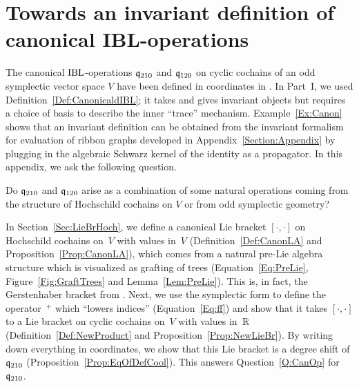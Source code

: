 \documentclass[\MainFolder/Text.tex]{subfiles}
\begin{document}
\chapter{Towards an invariant definition of canonical IBL-operations}
\label{Section:AppEqDefPrCoPr}
\allowdisplaybreaks
{}
The canonical $\mathrm{IBL}$-operations $\mathfrak{q}_{210}$ and $\mathfrak{q}_{120}$ on cyclic cochains of an odd symplectic vector space $V$ have been defined in coordinates in \cite{Cieliebak2015}. In Part~I, we used Definition~\ref{Def:CanonicaldIBL}; it takes and gives invariant objects but requires a choice of basis to describe the inner ``trace'' mechanism. Example~\ref{Ex:Canon} shows that an invariant definition can be obtained from the invariant formalism for evaluation of ribbon graphs developed in Appendix~\ref{Section:Appendix} by plugging in the algebraic Schwarz kernel of the identity as a propagator. In this appendix, we ask the following question.
\begin{Question}\label{Q:CanOp}
Do $\mathfrak{q}_{210}$ and $\mathfrak{q}_{120}$ arise as a combination of some natural operations coming from the structure of Hochschild cochains on $V$ or from odd symplectic geometry? 
\end{Question}
In Section~\ref{Sec:LieBrHoch}, we define a canonical Lie bracket $[\cdot,\cdot]$ on Hochschild cochains on~$V$ with values in~$V$ (Definition~\ref{Def:CanonLA} and Proposition~\ref{Prop:CanonLA}), which comes from a natural pre-Lie algebra structure which is visualized as grafting of trees (Equation~\eqref{Eq:PreLie}, Figure~\ref{Fig:GraftTrees} and Lemma~\ref{Lem:PreLie}). This is, in fact, the Gerstenhaber bracket from \cite{Gerstenhaber1963}. Next, we use the symplectic form to define the operator~${}^+$ which ``lowers indices'' (Equation~\ref{Eq:ff}) and show that it takes $[\cdot,\cdot]$ to a Lie bracket on cyclic cochains on~$V$ with values in~$\mathbb{R}$ (Definition~\ref{Def:NewProduct} and Proposition~\ref{Prop:NewLieBr}). By writing down everything in coordinates, we show that this Lie bracket is a degree shift of $\mathfrak{q}_{210}$ (Proposition~\ref{Prop:EqOfDefCool}). This answers Question~\ref{Q:CanOp} for $\mathfrak{q}_{210}$.
\end{document}
